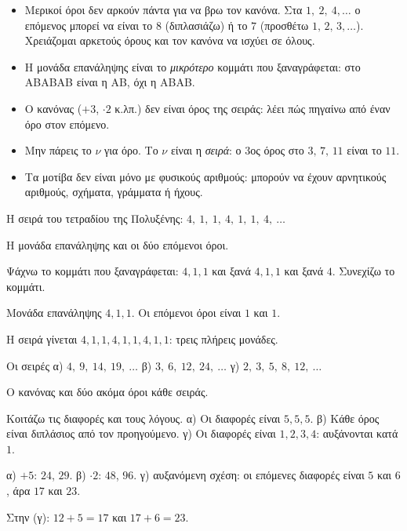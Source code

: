 \begin{prosoxi}
\begin{itemize}[leftmargin=1.2em,itemsep=0.3ex,topsep=2pt]
\item Μερικοί όροι δεν αρκούν πάντα για να βρω τον κανόνα. Στα $1,\ 2,\ 4,\dots$ ο επόμενος μπορεί να είναι το $8$ (διπλασιάζω) ή το $7$ (προσθέτω $1,\,2,\,3,\dots$). Χρειάζομαι αρκετούς όρους και τον κανόνα να ισχύει σε όλους.
\item Η μονάδα επανάληψης είναι το \emph{μικρότερο} κομμάτι που ξαναγράφεται: στο ΑΒΑΒΑΒ είναι η ΑΒ, όχι η ΑΒΑΒ.
\item Ο κανόνας ($+3$, $\cdot2$ κ.λπ.) δεν είναι όρος της σειράς: λέει πώς πηγαίνω από έναν όρο στον επόμενο.
\item Μην πάρεις το $\nu$ για όρο. Το $\nu$ είναι η \emph{σειρά}: ο $3$ος όρος στο $3,\,7,\,11$ είναι το $11$.
\item Τα μοτίβα δεν είναι μόνο με φυσικούς αριθμούς: μπορούν να έχουν αρνητικούς αριθμούς, σχήματα, γράμματα ή ήχους.
\end{itemize}
\end{prosoxi}


\tixero Η σειρά του τετραδίου της Πολυξένης: $4,\ 1,\ 1,\ 4,\ 1,\ 1,\ 4,\ \ldots$\par
\tithelo Η μονάδα επανάληψης και οι δύο επόμενοι όροι.\par
\possindeo Ψάχνω το κομμάτι που ξαναγράφεται: $4,1,1$ και ξανά $4,1,1$ και ξανά $4$. Συνεχίζω το κομμάτι.\par
\apantisi Μονάδα επανάληψης $4,1,1$. Οι επόμενοι όροι είναι $1$ και $1$.\par
\elegxos Η σειρά γίνεται $4,1,1,4,1,1,4,1,1$: τρεις πλήρεις μονάδες.

\tixero Οι σειρές α) $4,\ 9,\ 14,\ 19,\ \ldots$ β) $3,\ 6,\ 12,\ 24,\ \ldots$ γ) $2,\ 3,\ 5,\ 8,\ 12,\ \ldots$\par
\tithelo Ο κανόνας και δύο ακόμα όροι κάθε σειράς.\par
\possindeo Κοιτάζω τις διαφορές και τους λόγους. α) Οι διαφορές είναι $5,5,5$. β) Κάθε όρος είναι διπλάσιος από τον προηγούμενο. γ) Οι διαφορές είναι $1,2,3,4$: αυξάνονται κατά $1$.\par
\apantisi α) $+5$: $24$, $29$. β) $\cdot2$: $48$, $96$. γ) αυξανόμενη σχέση: οι επόμενες διαφορές είναι $5$ και $6$, άρα $17$ και $23$.\par
\elegxos Στην (γ): $12+5=17$ και $17+6=23$.

